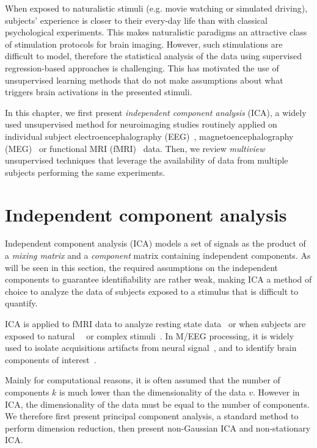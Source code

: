 When exposed to naturalistic stimuli (e.g. movie watching or simulated driving), subjects' experience is closer to their every-day life than with classical
psychological experiments.
% 
This makes naturalistic paradigms an attractive class of
stimulation protocols for brain imaging.
%
However, such stimulations are difficult to model, therefore the statistical analysis of the data using supervised regression-based approaches is challenging.
This has motivated the use of unsupervised learning methods that do not make
assumptions about what triggers brain activations in the presented stimuli.

In this chapter, we first present \emph{independent component analysis} (ICA), a widely used
unsupervised method for neuroimaging studies routinely applied on individual
subject electroencephalography (EEG)~\cite{makeig1996independent},
magnetoencephalography (MEG)~\cite{vigario1998independent} or functional MRI
(fMRI)~\cite{mckeown1998independent} data. Then, we review \emph{multiview} unsupervised 
techniques that leverage the availability of data from multiple subjects
performing the same experiments. 

\section{Independent component analysis}
\label{sec:ica}
Independent component analysis (ICA) models a set of signals as the product of a \emph{mixing matrix} and a
\emph{component} matrix containing independent components. As will be seen in this
section, the required assumptions on the independent components to guarantee
identifiability are rather weak, making ICA a method of choice to analyze the
data of subjects exposed to a stimulus that is difficult to quantify.

ICA is applied to fMRI data to analyze resting state
data~\cite{beckmann2005investigations} or when subjects are
exposed to natural~\cite{malinen2007towards}~\cite{bartels2005brain} or complex stimuli~\cite{calhoun2002different}. 
In M/EEG processing, it is widely used to isolate acquisitions artifacts from neural signal~\cite{jung1998extended}, and to identify brain components of interest~\cite{vigario2000independent, delorme2012independent}.

Mainly for computational reasons, it is often assumed that the number of components
$k$ is much lower than the dimensionality of the data $v$.
However in ICA, the dimensionality of the data must be equal to the
number of components.
We therefore first present principal component analysis, a standard method to perform
dimension reduction, then present non-Gaussian ICA and non-stationary ICA.

